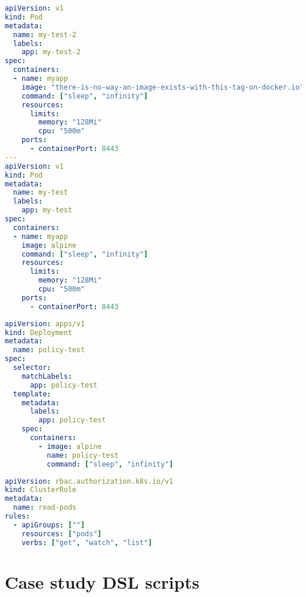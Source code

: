 \begin{lstlisting}[caption={junk.yaml},language=YAML,label=appendix:csr:junk]
apiVersion: v1
kind: Pod
metadata:
  name: my-test-2
  labels:
    app: my-test-2
spec:
  containers:
  - name: myapp
    image: "there-is-no-way-an-image-exists-with-this-tag-on-docker.io"
    command: ["sleep", "infinity"]
    resources:
      limits:
        memory: "128Mi"
        cpu: "500m"
    ports:
      - containerPort: 8443
---
apiVersion: v1
kind: Pod
metadata:
  name: my-test
  labels:
    app: my-test
spec:
  containers:
  - name: myapp
    image: alpine
    command: ["sleep", "infinity"]
    resources:
      limits:
        memory: "128Mi"
        cpu: "500m"
    ports:
      - containerPort: 8443
\end{lstlisting}

\begin{lstlisting}[caption={test-policy.yaml},language=YAML,label=appendix:csr:testpolicy]
apiVersion: apps/v1
kind: Deployment
metadata:
  name: policy-test
spec:
  selector:
    matchLabels:
      app: policy-test
  template:
    metadata:
      labels:
        app: policy-test
    spec:
      containers:
        - image: alpine
          name: policy-test
          command: ["sleep", "infinity"]
\end{lstlisting}

\begin{lstlisting}[caption={readPods.yaml},language=YAML,label=appendix:csr:readpods]
apiVersion: rbac.authorization.k8s.io/v1
kind: ClusterRole
metadata:
  name: read-pods
rules:
  - apiGroups: [""]
    resources: ["pods"]
    verbs: ["get", "watch", "list"]
\end{lstlisting}

\clearpage\section{Case study DSL scripts}

